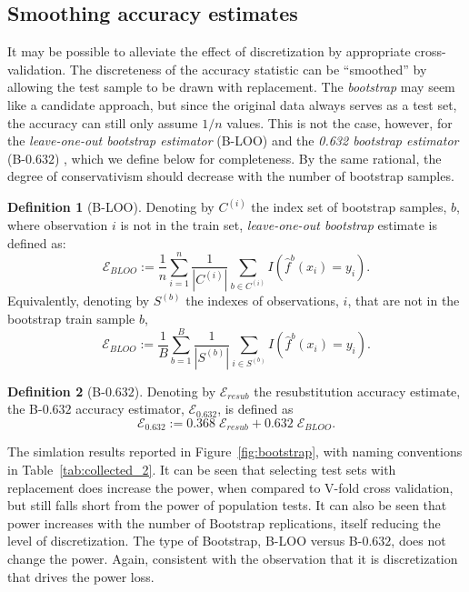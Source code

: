 \documentclass[12pt,a4paper]{article}
\theoremstyle{definition}
\newtheorem{definition}{Definition}
\newcommand{\hyp}{f} %
\newcommand{\hypEstim}{\hat{\hyp}} %
\newcommand{\acc}{\mathcal{E}}
\begin{document}
\subsection{Smoothing accuracy estimates}
It may be possible to alleviate the effect of discretization by appropriate cross-validation. 
The discreteness of the accuracy statistic can be ``smoothed'' by allowing the test sample to be drawn with replacement. 
The \emph{bootstrap} may seem like a candidate approach, but since the original data always serves as a test set, the accuracy can still only assume $1/n$ values. 
This is not the case, however, for the \emph{leave-one-out bootstrap estimator} (B-LOO) and the \emph{0.632 bootstrap estimator} (B-$0.632$) \citep[Sec 7.11]{hastie_elements_2003}, which we define below for completeness.
By the same rational, the degree of conservativism should decrease with the number of bootstrap samples. 

\begin{definition}[B-LOO]
\label{def:bloo}
Denoting by $C^{(i)}$ the index set of bootstrap samples, $b$, where observation $i$ is not in the train set, \emph{leave-one-out bootstrap} estimate is defined as:
$$
	\acc_{BLOO}:= \frac 1n \sum_{i=1}^{n} \frac{1}{|C^{(i)}|} \sum_{b \in C^{(i)}} I(\hypEstim^b(x_i)=y_i).
$$ 
Equivalently, denoting by $S^{(b)}$ the indexes of observations, $i$, that are not in the bootstrap train sample $b$,
$$
	\acc_{BLOO}:= \frac 1B \sum_{b=1}^{B} \frac{1}{|S^{(b)}|} \sum_{i \in S^{(b)}} I(\hypEstim^b(x_i)=y_i).
$$
\end{definition}

\begin{definition}[B-$0.632$]
\label{def:b0632}
Denoting by $\acc_{resub}$ the resubstitution accuracy estimate, the B-$0.632$ accuracy estimator, $\acc_{0.632}$, is defined as 
$$
	\acc_{0.632} := 0.368 \; \acc_{resub}  + 0.632 \; \acc_{BLOO}.
$$
\end{definition}

The simlation results reported in Figure~\ref{fig:bootstrap}, with naming conventions in Table~\ref{tab:collected_2}.
It can be seen that selecting test sets with replacement does increase the power, when compared to V-fold cross validation, but still falls short from the power of population tests. 
It can also be seen that power increases with the number of Bootstrap replications, itself reducing the level of discretization. 
The type of Bootstrap, B-LOO versus B-$0.632$, does not change the power. 
Again, consistent with the observation that it is discretization that drives the power loss. 
\end{document}

